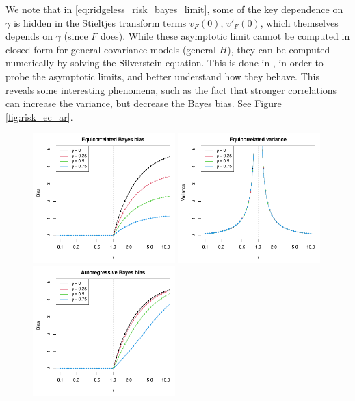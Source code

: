 \documentclass{article}
\begin{document}
We note that in \eqref{eq:ridgeless_risk_bayes_limit}, some of the key
dependence on $\gamma$ is hidden in the Stieltjes transform terms $v_F(0)$,
$v'_F(0)$, which themselves depends on $\gamma$ (since $F$ does). While these
asymptotic limit cannot be computed in closed-form for general covariance models
(general $H$), they can be computed numerically by solving the Silverstein
equation. This is done in \citet{hastie2022surprises}, in order to probe the
asymptotic limits, and better understand how they behave. This reveals some
interesting phenomena, such as the fact that stronger correlations can increase
the variance, but decrease the Bayes bias. See Figure \ref{fig:risk_ec_ar}.   

\begin{figure}[p]
\centering
\includegraphics[width=0.49\textwidth]{bias_ec.pdf}
\includegraphics[width=0.49\textwidth]{var_ec.pdf}
\includegraphics[width=0.49\textwidth]{bias_ar.pdf}

\end{figure}
\end{document}
